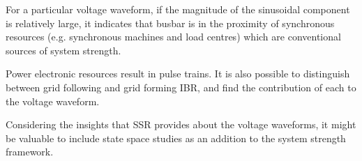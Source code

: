 \documentclass[11pt,a4paper,]{article}
\begin{document}
For a particular voltage waveform, if the magnitude of the sinusoidal component is relatively large, it indicates that busbar is in the proximity of synchronous resources (e.g. synchronous machines and load centres) which are conventional sources of system strength.

Power electronic resources result in pulse trains. It is also possible to distinguish between grid following and grid forming IBR, and find the contribution of each to the voltage waveform.

Considering the insights that SSR provides about the voltage waveforms, it might be valuable to include state space studies as an addition to the system strength framework.


\printbibliography

\newpage
\end{document}
